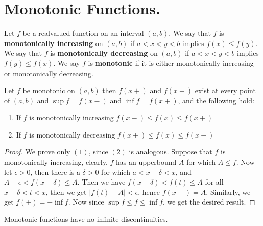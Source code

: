 
\section{Monotonic Functions.}

\begin{definition}
    Let $f$ be a realvalued function on an interval  $(a,b)$. We say that  $f$ is 
    \textbf{monotonically increasing} on $(a,b)$ if  $a<x<y<b$ implies  $f(x) \leq f(y)$. 
    We say that  $f$ is \textbf{monotonically decreasing} on $(a,b)$ if  $a<x<y<b$ 
    implies  $f(y) \leq f(x)$. We say $f$ is \textbf{monotonic} if it is either monotonically 
    increasing or monotonically decreasing.
\end{definition}

\begin{theorem}\label{5.6.1}
    Let $f$ be monotonic on $(a,b)$ then $f(x+)$ and  $f(x-)$ exist at every point of 
    $(a,b)$ and $\sup{f}=f(x-)$ and  $\inf{f}=f(x+)$, and the following hold:
        \begin{enumerate}[label=(\arabic*)]
            \begin{enumerate}[label=(\arabic*)]
                \item If $f$ is monotonically increasing $f(x-) \leq f(x) \leq f(x+)$

                \item If $f$ is monotonically decreasing $f(x+) \leq f(x) \leq f(x-)$
            \end{enumerate}		
        \end{enumerate}
\end{theorem}
\begin{proof}
    We prove only $(1)$, since  $(2)$ is analogous. Suppose that $f$ is monotonically 
    increasing, clearly,  $f$ has an upperbound  $A$ for which  $A \leq f$. Now let  $\epsilon>0$, 
    then there is a  $\delta>0$ for which  $a<x-\delta<x$, and  $A-\epsilon<f(x-\delta) \leq A$.  Then we have 
    $f(x-\delta)<f(t) \leq A$ for all  $x-\delta<t<x$, then we get  $|f(t)-A|<\epsilon$, hence 
    $f(x-)=A$, Similarly, we get  $f(+)=-\inf{f}$. Now since  $\sup{f} \leq f \leq \inf{f}$, 
    we get the desired result.
\end{proof}

\begin{corollary}
    Monotonic functions have no infinite discontinuities.		
\end{corollary}

